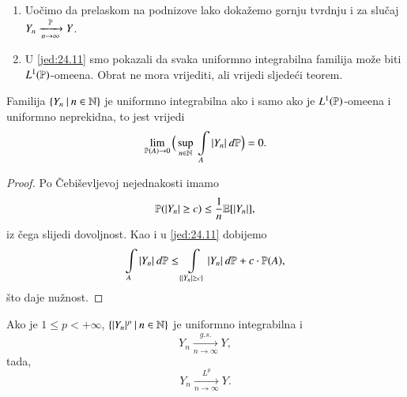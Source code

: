 \begin{nap} \label{nap:24.12}
    \begin{enumerate}[label=(\alph*)]
        \item \label{nap:24.12.1}
        Uo\v cimo da prelaskom na podnizove lako doka\v zemo gornju tvrdnju i za slu\v caj $Y_n \xrightarrow[n \to \infty]{\mathbb{P}} Y$.
        \item \label{nap:24.12.2}
        U \eqref{jed:24.11} smo pokazali da svaka uniformno integrabilna familija mo\v ze biti $L^1 (\mathbb{P})$-ome\dj ena.
        Obrat ne mora vrijediti, ali vrijedi sljede\' ci teorem.
    \end{enumerate}
\end{nap}

\begin{tm}  \label{tm:24.13}
    Familija $\{{Y_n} \: | \: {n \in \mathbb{N}}\}$ je uniformno integrabilna ako i samo ako je $L^1 (\mathbb{P})$-ome\dj ena i uniformno neprekidna, to jest vrijedi
    \begin{equation*}
        \lim\limits_{\mathbb{P} (A) \to 0} \Big( \sup\limits_{n \in \mathbb{N}} \: \int\limits_A |Y_n| \: d \mathbb{P} \Big) = 0.
    \end{equation*}
\end{tm}

\begin{proof}
    Po \v Cebi\v sevljevoj nejednakosti imamo
    \begin{equation*}
        \mathbb{P} ( |Y_n| \geq c) \leq \frac{1}{n} \mathbb{E} [|Y_n|],
    \end{equation*}
    iz \v cega slijedi dovoljnost.
    Kao i u \eqref{jed:24.11} dobijemo
    \begin{equation*}
        \int\limits_A |Y_n| \: d \mathbb{P} \leq \int\limits_{\{ |Y_n| \geq c \}} |Y_n| \: d \mathbb{P} + c \cdot \mathbb{P} ( A ),
    \end{equation*}
    \v sto daje nu\v znost.
\end{proof}

\begin{tm}  \label{tm:24.14}
    Ako je $1 \leq p < +\infty$, $\{{|Y_n|^p} \: | \: {n \in \mathbb{N}}\}$ je uniformno integrabilna i
    \begin{equation*}
        Y_n \xrightarrow[n \to \infty]{g.s.} Y,
    \end{equation*}
    tada,
    \begin{equation*}
        Y_n \xrightarrow[n \to \infty]{L^p} Y.
    \end{equation*}
\end{tm}

